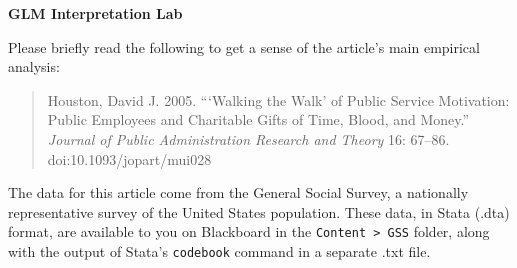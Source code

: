 \documentclass[a4paper,12pt]{article}
\begin{document}
\begin{center}
\textbf{GLM Interpretation Lab}
\end{center}

\noindent Please briefly read the following to get a sense of the article's main empirical analysis:

\begin{quote}
Houston, David J. 2005. ```Walking the Walk' of Public Service Motivation: Public Employees and Charitable Gifts of Time, Blood, and Money.'' {\em Journal of Public Administration Research and Theory} 16: 67--86. doi:10.1093/jopart/mui028
\end{quote}

\noindent The data for this article come from the General Social Survey, a nationally representative survey of the United States population. These data, in Stata (.dta) format, are available to you on Blackboard in the \texttt{Content > GSS} folder, along with the output of Stata's \texttt{codebook} command in a separate .txt file.
\end{document}
